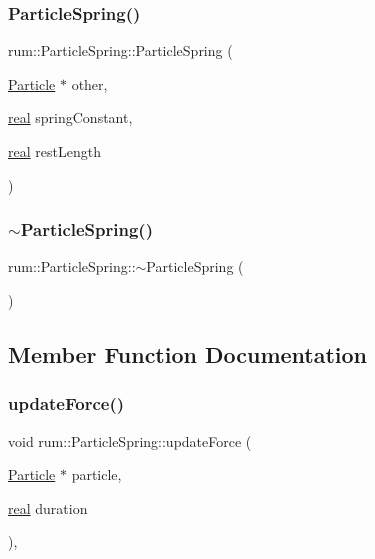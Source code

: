 \subsubsection{\texorpdfstring{Particle\+Spring()}{ParticleSpring()}}
{\footnotesize\ttfamily rum\+::\+Particle\+Spring\+::\+Particle\+Spring (\begin{DoxyParamCaption}\item[{\mbox{\hyperlink{classrum_1_1_particle}{Particle}} $\ast$}]{other,  }\item[{\mbox{\hyperlink{namespacerum_a7e8cca23573d5eaead0f138cbaa4862c}{real}}}]{spring\+Constant,  }\item[{\mbox{\hyperlink{namespacerum_a7e8cca23573d5eaead0f138cbaa4862c}{real}}}]{rest\+Length }\end{DoxyParamCaption})}

\mbox{\label{classrum_1_1_particle_spring_ac48ba65487b023ea754b4e0e8a33dafc}} 
\subsubsection{\texorpdfstring{$\sim$\+Particle\+Spring()}{~ParticleSpring()}}
{\footnotesize\ttfamily rum\+::\+Particle\+Spring\+::$\sim$\+Particle\+Spring (\begin{DoxyParamCaption}{ }\end{DoxyParamCaption})\hspace{0.3cm}{\ttfamily [default]}}



\subsection{Member Function Documentation}
\mbox{\label{classrum_1_1_particle_spring_acd45c3481f7e7d43978429c7e3e8c660}} 
\subsubsection{\texorpdfstring{update\+Force()}{updateForce()}}
{\footnotesize\ttfamily void rum\+::\+Particle\+Spring\+::update\+Force (\begin{DoxyParamCaption}\item[{\mbox{\hyperlink{classrum_1_1_particle}{Particle}} $\ast$}]{particle,  }\item[{\mbox{\hyperlink{namespacerum_a7e8cca23573d5eaead0f138cbaa4862c}{real}}}]{duration }\end{DoxyParamCaption})\hspace{0.3cm}{\ttfamily [override]}, {\ttfamily [virtual]}}



